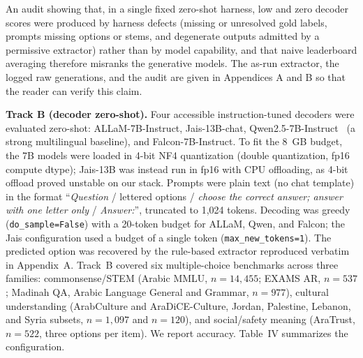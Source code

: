\item An audit showing that, in a single fixed zero-shot harness, low and zero decoder
      scores were produced by harness defects (missing or unresolved gold labels,
      prompts missing options or stems, and degenerate outputs admitted by a permissive
      extractor) rather than by model capability, and that naive leaderboard averaging
      therefore misranks the generative models. The as-run extractor, the logged raw
      generations, and the audit are given in Appendices A and B so that the reader can
      verify this claim.

\textbf{Track B (decoder zero-shot).} Four accessible instruction-tuned decoders were
evaluated zero-shot: ALLaM-7B-Instruct, Jais-13B-chat, Qwen2.5-7B-Instruct~\cite{qwen25}
(a strong multilingual baseline), and Falcon-7B-Instruct. To fit the 8~GB budget, the
7B models were loaded in 4-bit NF4 quantization (double quantization, fp16 compute
dtype); Jais-13B was instead run in fp16 with CPU offloading, as 4-bit offload proved
unstable on our stack. Prompts were plain text (no chat template) in the format
``\emph{Question} / lettered options / \emph{choose the correct answer; answer with one
letter only} / \emph{Answer:}'', truncated to 1,024 tokens. Decoding was greedy
(\texttt{do\_sample=False}) with a 20-token budget for ALLaM, Qwen, and Falcon; the
Jais configuration used a budget of a single token (\texttt{max\_new\_tokens=1}). The predicted option was
recovered by the rule-based extractor reproduced verbatim in Appendix~A. Track~B covered
six multiple-choice benchmarks across three families: commonsense/STEM (Arabic MMLU,
$n{=}14{,}455$; EXAMS AR, $n{=}537$; Madinah QA, Arabic Language General and Grammar,
$n{=}977$), cultural understanding (ArabCulture and AraDiCE-Culture, Jordan, Palestine,
Lebanon, and Syria subsets, $n{=}1{,}097$ and $n{=}120$), and social/safety meaning
(AraTrust, $n{=}522$, three options per item). We report accuracy. Table~IV summarizes
the configuration.

